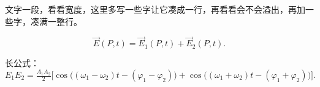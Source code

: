 ﻿\documentclass[11pt]{ctexart}
\begin{document}
文字一段，看看宽度，这里多写一些字让它凑成一行，再看看会不会溢出，再加一些字，凑满一整行。

\[
\vec{E}(P,t)=\vec{E}_1(P,t)+\vec{E}_2(P,t).
\]

长公式：
\[
E_1E_2=\tfrac{A_1A_2}{2}\Big[\cos\big((\omega_1-\omega_2)t-(\varphi_1-\varphi_2)\big)+\cos\big((\omega_1+\omega_2)t-(\varphi_1+\varphi_2)\big)\Big].
\]
\end{document}

